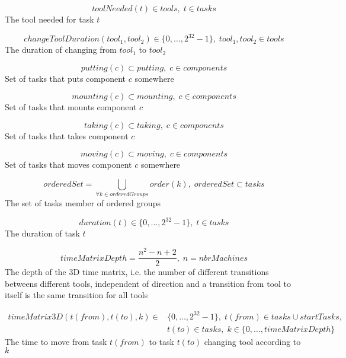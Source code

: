 \documentclass[10pt,a4paper]{report}
\begin{document}
\begin{equation}\label{eq:33}
toolNeeded(t) \in tools, \; t \in tasks\end{equation} 
The tool needed for task $t$

\begin{equation}\label{eq:34}
changeToolDuration(tool_1,tool_2) \in \{0 , \ldots , 2^{32}-1\}, \; tool_1,tool_2 \in tools
\end{equation} 
The duration of changing from $tool_1$ to $tool_2$

\begin{equation}\label{eq:35}
putting(c) \subset putting, \; c \in components\end{equation}
Set of tasks that puts component $c$ somewhere

\begin{equation}\label{eq:36}
mounting(c) \subset mounting, \; c \in components\end{equation}
Set of tasks that mounts component $c$

\begin{equation}\label{eq:37}
taking(c) \subset taking, \; c \in components\end{equation}
Set of tasks that takes component $c$

\begin{equation}\label{eq:38}
moving(c) \subset moving, \; c \in components\end{equation}
Set of tasks that moves component $c$ somewhere

\begin{equation}\label{eq:39}
orderedSet = \bigcup_{\forall k \in orderedGroups}order(k), \; orderedSet \subset tasks\end{equation}
The set of tasks member of ordered groups

\begin{equation}\label{eq:42}
duration(t) \in \{0 , \ldots , 2^{32}-1\}, \; t \in tasks\end{equation}
The duration of task $t$

\begin{equation}\label{eq:43}
timeMatrixDepth = \frac{n^2 - n + 2}{2}, \; n = nbrMachines\end{equation}
The depth of the 3D time matrix, i.e. the number of different transitions betweens different tools, independent of direction and a transition from tool to itself is the same transition for all tools

\begin{equation}
\begin{aligned}\label{eq:44}
timeMatrix3D(t(from),t(to),k) \in &\{0 , \ldots , 2^{32}-1\}, \; t(from) \in tasks \cup startTasks,  \\ 
&t(to) \in tasks, \; k \in \{0 , \ldots , timeMatrixDepth\}
\end{aligned}
\end{equation}
The time to move from task $t(from)$ to task $t(to)$ changing tool according to $k$
\end{document}
